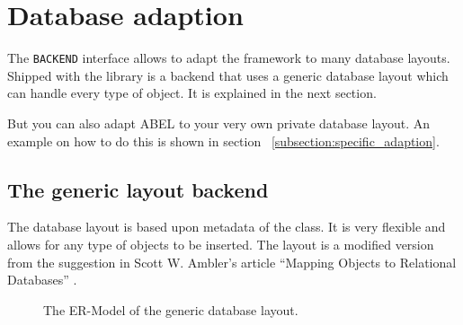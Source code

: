 \documentclass[a4paper,12pt]{report}
\begin{document}
\chapter{Database adaption}

The \lstinline!BACKEND! interface allows to adapt the framework to many database layouts.
Shipped with the library is a backend that uses a generic database layout which can handle every type of object.
It is explained in the next section.

But you can also adapt ABEL to your very own private database layout.
An example on how to do this is shown in section ~\ref{subsection:specific_adaption}.

\section{The generic layout backend}

The database layout is based upon metadata of the class. 
It is very flexible and allows for any type of objects to be inserted.
The layout is a modified version from the suggestion in Scott W. Ambler's article ``Mapping Objects to Relational Databases'' \cite{AmblerORM}.

\begin{figure} [h!]
\centering
{}
\caption{The ER-Model of the generic database layout.}
\label{fig:er_model_generic_layout}
\end{figure}
\end{document}
